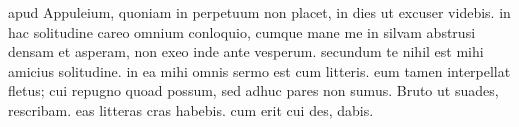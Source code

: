 


 apud Appuleium, quoniam in perpetuum non placet, in dies ut excuser videbis. in hac solitudine careo omnium conloquio, cumque mane me in silvam abstrusi densam et asperam, non exeo inde ante vesperum. secundum te nihil est mihi amicius solitudine. in ea mihi omnis sermo est cum litteris. eum tamen interpellat fletus; cui repugno quoad possum, sed adhuc pares non sumus. Bruto ut suades, rescribam. eas litteras cras habebis. cum erit cui des, dabis.

